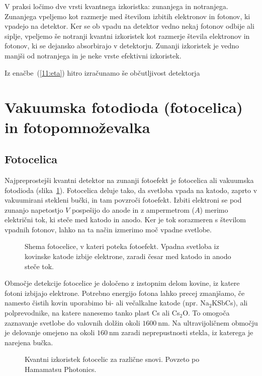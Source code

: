 \begin{remark}
V praksi ločimo dve vrsti kvantnega izkoristka: zunanjega in notranjega. Zunanjega vpeljemo kot 
razmerje med številom izbitih elektronov in fotonov, ki vpadejo na detektor. Ker se 
ob vpadu na detektor vedno nekaj fotonov odbije ali siplje, vpeljemo še notranji kvantni 
izkoristek kot razmerje števila elektronov in fotonov, ki se dejansko absorbirajo v detektorju.
Zunanji izkoristek je vedno manjši od notranjega in je neke vrste efektivni 
izkoristek.
\end{remark}

Iz enačbe~(\ref{11:eta}) hitro izračunamo še občutljivost detektorja 

\section{Vakuumska fotodioda (fotocelica) in fotopomnoževalka}
\subsection*{Fotocelica}
Najpreprostejši kvantni detektor na zunanji fotoefekt je fotocelica ali vakuumska fotodioda
(slika~\ref{fig:Fotoefekt}). Fotocelica deluje tako, da svetloba vpada na katodo, 
zaprto v vakuumirani stekleni bučki, in tam povzroči fotoefekt. Izbiti elektroni 
se pod zunanjo napetostjo $V$ pospešijo do anode in z ampermetrom ($A$) 
merimo električni tok, ki steče med katodo in anodo. 
Ker je tok sorazmeren s številom vpadnih fotonov, lahko na ta 
način izmerimo moč vpadne svetlobe.

\begin{figure}[h]
\centering
\def\svgwidth{60truemm} 

\caption{Shema fotocelice, v kateri poteka fotoefekt. 
Vpadna svetloba iz kovinske katode izbije elektrone, zaradi česar med katodo 
in anodo steče tok.}
\label{fig:Fotoefekt}
\end{figure}

Območje detekcije fotocelice je določeno z izstopnim delom kovine, iz 
katere fotoni izbijajo elektrone. Potrebno energijo fotona lahko precej zmanjšamo, 
če namesto čistih kovin uporabimo bi- ali večalkalne katode 
(npr. Na$_2$KSbCs), ali polprevodnike, na katere nanesemo tanko plast 
Cs ali Cs$_2$O. To omogoča zaznavanje svetlobe do valovnih dolžin okoli $1600~\si{\nano\metre}$. 
Na ultravijoličnem območju je delovanje
omejeno na okoli $160~\si{\nano\metre}$ zaradi neprepustnosti stekla, 
iz katerega je narejena bučka.
\begin{figure}[h]
\centering
\def\svgwidth{130truemm} 

\caption{Kvantni izkoristek fotocelic za različne snovi. Povzeto po Hamamatsu Photonics.}
\label{fig:Fotodioda}
\end{figure}


